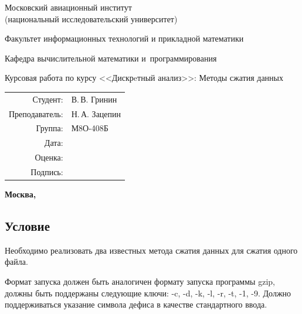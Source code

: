 \documentclass[12pt]{article}
\begin{document}
\begin{titlepage}
	\begin{center}
		\bfseries
		
		{\Large Московский авиационный институт\\ (национальный исследовательский университет)
			
		}
		
		\vspace{48pt}
		
		{\large Факультет информационных технологий и прикладной математики
		}
		
		\vspace{36pt}
		
		
		{\large Кафедра вычислительной математики и~программирования
			
		}
		
		
		\vspace{48pt}
		
		Курсовая работа по курсу <<Дискрeтный анализ>>: Методы сжатия данных
	\end{center}
	
	\vspace{72pt}
	
	\begin{flushright}
		\begin{tabular}{rl}
			Студент: & В.\,В. Гринин  \\
			Преподаватель: & Н.\,А. Зацепин \\
			Группа: & М8О-408Б \\
			Дата: & \\
			Оценка: & \\
			Подпись: & \\
		\end{tabular}
	\end{flushright}
	
	\vfill
	
	\begin{center}
		\bfseries
		Москва, \the\year
	\end{center}
\end{titlepage}

\pagebreak

\subsection*{Условие}

Необходимо реализовать два известных метода сжатия данных для сжатия одного файла. 

Формат запуска должен быть аналогичен формату запуска программы gzip, должны быть поддержаны следующие ключи: -c, -d, -k, -l, -r, -t, -1, -9. Должно поддерживаться указание символа дефиса в качестве стандартного ввода.
\end{document}
